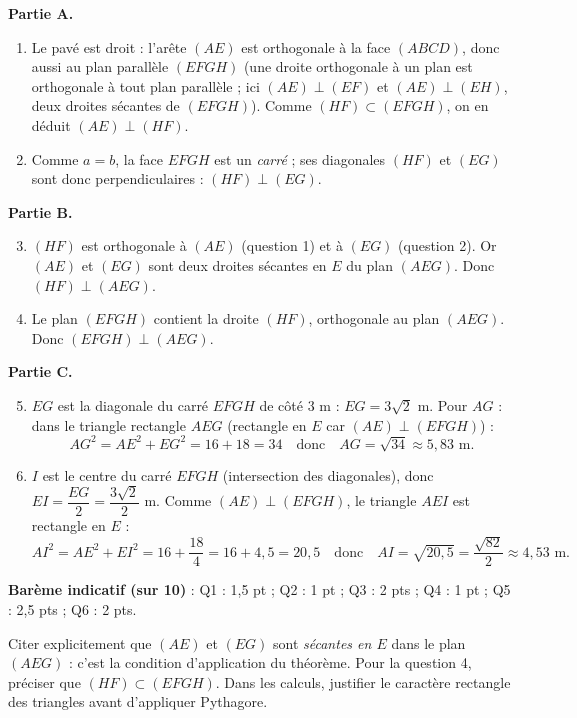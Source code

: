 \documentclass[11pt]{article}
\begin{document}
\begin{corrige}
\textbf{Partie A.}
\begin{enumerate}
\item Le pavé est droit : l'arête $(AE)$ est orthogonale à la face $(ABCD)$, donc aussi au plan parallèle $(EFGH)$ (une droite orthogonale à un plan est orthogonale à tout plan parallèle ; ici $(AE) \perp (EF)$ et $(AE) \perp (EH)$, deux droites sécantes de $(EFGH)$). Comme $(HF) \subset (EFGH)$, on en déduit $(AE) \perp (HF)$.
\item Comme $a = b$, la face $EFGH$ est un \emph{carré} ; ses diagonales $(HF)$ et $(EG)$ sont donc perpendiculaires : $(HF) \perp (EG)$.
\end{enumerate}
\textbf{Partie B.}
\begin{enumerate}
\setcounter{enumi}{2}
\item $(HF)$ est orthogonale à $(AE)$ (question 1) et à $(EG)$ (question 2). Or $(AE)$ et $(EG)$ sont deux droites sécantes en $E$ du plan $(AEG)$. Donc $(HF) \perp (AEG)$.
\item Le plan $(EFGH)$ contient la droite $(HF)$, orthogonale au plan $(AEG)$. Donc $(EFGH) \perp (AEG)$.
\end{enumerate}
\textbf{Partie C.}
\begin{enumerate}
\setcounter{enumi}{4}
\item $EG$ est la diagonale du carré $EFGH$ de côté $3$ m : $EG = 3\sqrt{2}$ m. Pour $AG$ : dans le triangle rectangle $AEG$ (rectangle en $E$ car $(AE) \perp (EFGH)$) :
\[ AG^2 = AE^2 + EG^2 = 16 + 18 = 34 \quad \text{donc} \quad AG = \sqrt{34} \approx 5{,}83 \text{ m}. \]
\item $I$ est le centre du carré $EFGH$ (intersection des diagonales), donc $EI = \dfrac{EG}{2} = \dfrac{3\sqrt{2}}{2}$ m. Comme $(AE) \perp (EFGH)$, le triangle $AEI$ est rectangle en $E$ :
\[ AI^2 = AE^2 + EI^2 = 16 + \frac{18}{4} = 16 + 4{,}5 = 20{,}5 \quad \text{donc} \quad AI = \sqrt{20{,}5} = \frac{\sqrt{82}}{2} \approx 4{,}53 \text{ m}. \]
\end{enumerate}
\textbf{Barème indicatif (sur 10)} : Q1 : 1,5 pt ; Q2 : 1 pt ; Q3 : 2 pts ; Q4 : 1 pt ; Q5 : 2,5 pts ; Q6 : 2 pts.
\begin{attention}
Citer explicitement que $(AE)$ et $(EG)$ sont \emph{sécantes en $E$} dans le plan $(AEG)$ : c'est la condition d'application du théorème. Pour la question 4, préciser que $(HF) \subset (EFGH)$. Dans les calculs, justifier le caractère rectangle des triangles avant d'appliquer Pythagore.
\end{attention}
\end{corrige}
\end{document}
